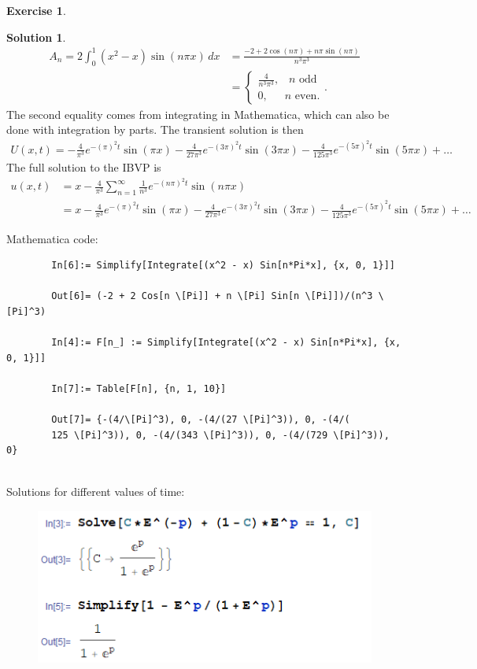 \documentclass{article}
\theoremstyle{definition}
\newtheorem*{exer*}{Exercise}
\newtheorem*{sln*}{Solution}
\begin{document}
\begin{exer*}
\begin{sln*}
\begin{align*}
		A_n = 2\int_{0}^{1}(x^2 - x)\sin(n\pi x)\,dx &= \frac{-2+2\cos(n\pi) + n\pi\sin(n\pi)}{n^3\pi^3}\\
		&= \begin{cases}
		\frac{4}{n^3\pi^3},\,\,\,\,\, n \text{ odd}\\
		0,\,\,\,\,\,\,\,\,\, n \text{ even}.
		\end{cases}.
		\end{align*}
		The second equality comes from integrating in Mathematica, which can also be done with integration by parts. The transient solution is then
		\begin{align*}
		U(x,t) = -\frac{4}{\pi ^3}e^{-(\pi)^2t} \sin(\pi x)   -\frac{4}{27 \pi ^3}e^{-(3\pi)^2t} \sin(3\pi x)    -\frac{4}{125 \pi ^3}e^{-(5\pi)^2t} \sin(5\pi x)  + \dots
		\end{align*}
		The full solution to the IBVP is
		\begin{align*}
		u(x,t) &= x- \frac{4}{\pi^3}\sum_{n=1}^\infty\frac{1}{n^3}e^{-(n\pi)^2t}\sin(n\pi x) \\ 
		&= x -\frac{4}{\pi ^3}e^{-(\pi)^2t} \sin(\pi x)   -\frac{4}{27 \pi ^3}e^{-(3\pi)^2t} \sin(3\pi x)    -\frac{4}{125 \pi ^3}e^{-(5\pi)^2t} \sin(5\pi x)  + \dots
		\end{align*}
		
		
		\noindent Mathematica code:
		\begin{lstlisting}
		In[6]:= Simplify[Integrate[(x^2 - x) Sin[n*Pi*x], {x, 0, 1}]]
		
		Out[6]= (-2 + 2 Cos[n \[Pi]] + n \[Pi] Sin[n \[Pi]])/(n^3 \[Pi]^3)
		
		In[4]:= F[n_] := Simplify[Integrate[(x^2 - x) Sin[n*Pi*x], {x, 0, 1}]]
		
		In[7]:= Table[F[n], {n, 1, 10}]
		
		Out[7]= {-(4/\[Pi]^3), 0, -(4/(27 \[Pi]^3)), 0, -(4/(
		125 \[Pi]^3)), 0, -(4/(343 \[Pi]^3)), 0, -(4/(729 \[Pi]^3)), 0}
		\end{lstlisting}
		$\,$\\
		\noindent Solutions for different values of time:\\
		
		\begin{figure}[h!]
			\centering
			\includegraphics[scale=0.7]{1.png}
		\end{figure}
		

\end{sln*}
\end{exer*}
\end{document}
